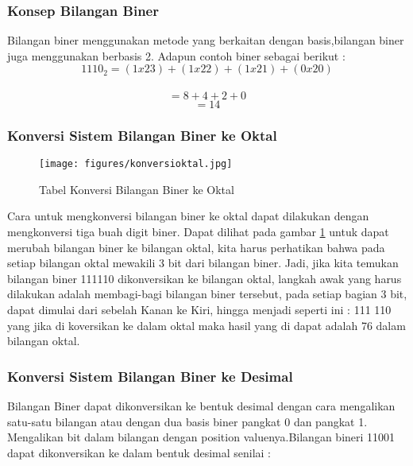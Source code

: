 \subsubsection{Konsep Bilangan Biner}
Bilangan biner menggunakan metode yang berkaitan dengan basis,bilangan biner juga menggunakan berbasis 2. Adapun contoh biner sebagai berikut : \\
\begin{equation} 1110_{2} = (1x23)+(1x22)+(1x21)+(0x20) \end{equation}\\
\begin{equation} = 8+4+2+0\end{equation}
\begin{equation}= 14 \end{equation}

\subsubsection{Konversi Sistem Bilangan Biner ke Oktal}
\begin{figure}[ht]
\centerline{\texttt{[image: figures/konversioktal.jpg]}}
\caption{Tabel Konversi Bilangan Biner ke Oktal}
\label{konversioktal}
\end{figure}
\break
Cara untuk mengkonversi bilangan biner ke oktal dapat dilakukan dengan mengkonversi tiga buah digit biner. Dapat dilihat pada gambar \ref{konversioktal} untuk dapat merubah bilangan biner ke bilangan oktal, kita harus perhatikan bahwa pada setiap bilangan oktal mewakili 3 bit dari bilangan biner. Jadi, jika kita temukan bilangan biner 111110 dikonversikan ke bilangan oktal, langkah awak yang harus dilakukan adalah membagi-bagi bilangan biner tersebut, pada setiap bagian 3 bit, dapat dimulai dari sebelah Kanan ke Kiri, hingga menjadi seperti ini : 111 110 yang jika di koversikan ke dalam oktal maka hasil yang di dapat adalah 76 dalam bilangan oktal.

\subsubsection{Konversi Sistem Bilangan Biner ke Desimal}
Bilangan Biner dapat dikonversikan ke bentuk desimal dengan cara mengalikan satu-satu bilangan atau dengan dua basis biner pangkat 0 dan pangkat 1. Mengalikan bit dalam bilangan dengan position valuenya.Bilangan bineri 11001 dapat dikonversikan ke dalam bentuk desimal senilai : \\

